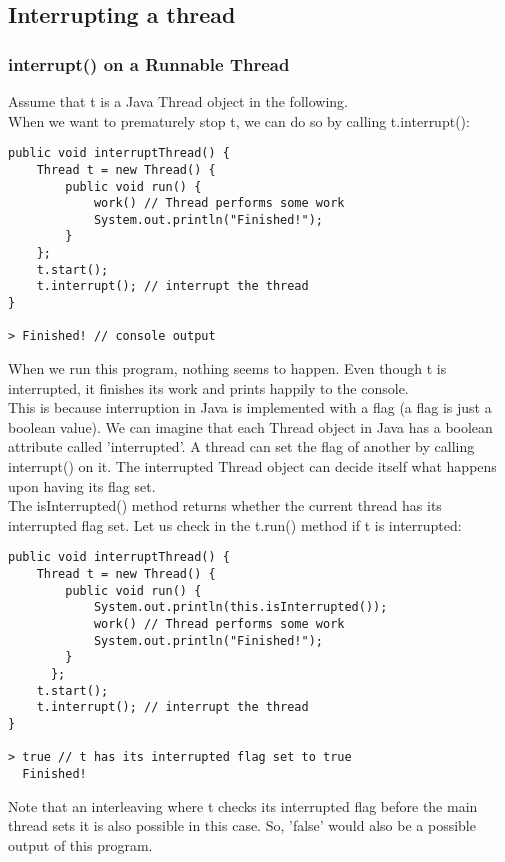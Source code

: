 \documentclass[main.tex]{subfiles}
\begin{document}
\subsection{Interrupting a thread}
\subsubsection{interrupt() on a Runnable Thread}
Assume that t is a Java Thread object in the following.\\
When we want to prematurely stop t, we can do so by calling t.interrupt():
\begin{verbatim}
public void interruptThread() {
    Thread t = new Thread() {
        public void run() {
            work() // Thread performs some work
            System.out.println("Finished!");
        }
    };
    t.start();
    t.interrupt(); // interrupt the thread
}

> Finished! // console output
\end{verbatim}
When we run this program, nothing seems to happen. Even though t is interrupted, it finishes its work and prints happily to the console.\\
This is because interruption in Java is implemented with a flag (a flag is just a boolean value). We can imagine that each Thread object in Java has a boolean attribute called 'interrupted'. A thread can set the flag of another by calling interrupt() on it. The interrupted Thread object can decide itself what happens upon having its flag set.\\
The isInterrupted() method returns whether the current thread has its interrupted flag set. Let us check in the t.run() method if t is interrupted:
\begin{verbatim}
public void interruptThread() {
    Thread t = new Thread() {
        public void run() {
            System.out.println(this.isInterrupted());
            work() // Thread performs some work
            System.out.println("Finished!");
        }
      };
    t.start();
    t.interrupt(); // interrupt the thread
}

> true // t has its interrupted flag set to true
  Finished!
\end{verbatim}
Note that an interleaving where t checks its interrupted flag before the main thread sets it is also possible in this case. So, 'false' would also be a possible output of this program.
\end{document}
